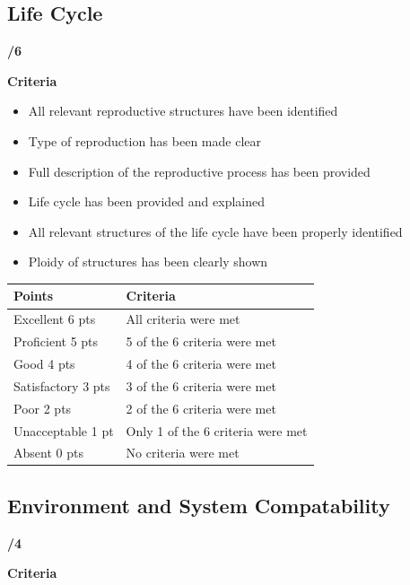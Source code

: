 \documentclass[
]{book}
\providecommand{\tightlist}{%
  \setlength{\itemsep}{0pt}\setlength{\parskip}{0pt}}
\begin{document}
\hypertarget{life-cycle}{%
\subsection*{Life Cycle}\label{life-cycle}}

\textbf{/6}

\textbf{Criteria}

\begin{itemize}
\tightlist
\item
  All relevant reproductive structures have been identified
\item
  Type of reproduction has been made clear
\item
  Full description of the reproductive process has been provided
\item
  Life cycle has been provided and explained
\item
  All relevant structures of the life cycle have been properly identified
\item
  Ploidy of structures has been clearly shown
\end{itemize}

\begin{longtable}[]{@{}ll@{}}
\toprule()
Points & Criteria \\
\midrule()
\endhead
Excellent 6 pts & All criteria were met \\
Proficient 5 pts & 5 of the 6 criteria were met \\
Good 4 pts & 4 of the 6 criteria were met \\
Satisfactory 3 pts & 3 of the 6 criteria were met \\
Poor 2 pts & 2 of the 6 criteria were met \\
Unacceptable 1 pt & Only 1 of the 6 criteria were met \\
Absent 0 pts & No criteria were met \\
\bottomrule()
\end{longtable}

\hypertarget{environment-and-system-compatability}{%
\subsection*{Environment and System Compatability}\label{environment-and-system-compatability}}

\textbf{/4}

\textbf{Criteria}
\end{document}
